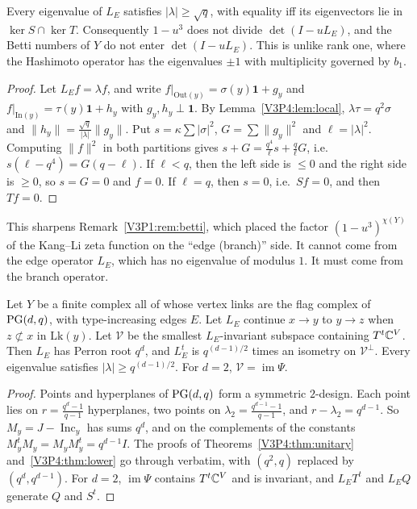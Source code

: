 \begin{theorem}\label{V3P4:thm:lower}
Every eigenvalue of $L_E$ satisfies $|\lambda|\ge\sqrt q$, with equality iff its eigenvectors
lie in $\ker S\cap\ker T$. Consequently $1-u^{3}$ does not divide $\det(I-uL_E)$, and the Betti
numbers of $Y$ do not enter $\det(I-uL_E)$. This is unlike rank one, where the Hashimoto
operator has the eigenvalues $\pm1$ with multiplicity governed by $b_1$.
\end{theorem}

\begin{proof}
Let $L_Ef=\lambda f$, and write $f|_{\mathrm{Out}(y)}=\sigma(y)\mathbf 1+g_y$ and
$f|_{\mathrm{In}(y)}=\tau(y)\mathbf 1+h_y$ with $g_y,h_y\perp\mathbf 1$. By
Lemma~\ref{V3P4:lem:local}, $\lambda\tau=q^{2}\sigma$ and $\|h_y\|=\frac{\sqrt q}{|\lambda|}\|g_y\|$. Put
$s=\kappa\sum|\sigma|^{2}$, $G=\sum\|g_y\|^{2}$ and $\ell=|\lambda|^{2}$. Computing $\|f\|^{2}$ in
both partitions gives $s+G=\frac{q^{4}}{\ell}s+\frac q\ell G$, i.e.\
$s(\ell-q^{4})=G(q-\ell)$. If $\ell<q$, then the left side is $\le0$ and the right side is
$\ge0$, so $s=G=0$ and $f=0$. If $\ell=q$, then $s=0$, i.e.\ $Sf=0$, and then $Tf=0$.
\end{proof}

\begin{remark}\label{V3P4:rem:betti}
This sharpens Remark~\ref{V3P1:rem:betti}, which placed the factor $(1-u^{3})^{\chi(Y)}$ of the
Kang--Li zeta function on the ``edge (branch)'' side. It cannot come from the edge operator
$L_E$, which has no eigenvalue of modulus $1$. It must come from the branch operator.
\end{remark}

\begin{theorem}\label{V3P4:thm:Ad}
Let $Y$ be a finite complex all of whose vertex links are the flag complex of $\mathrm{PG}(d,q)$, with
type-increasing edges $E$. Let $L_E$ continue $x\to y$ to $y\to z$ when $z\not\subset x$ in
$\mathrm{Lk}(y)$. Let $\mathcal V$ be the smallest $L_E$-invariant subspace containing
$T^{t}\mathbb{C}^{V}$. Then $L_E$ has Perron root $q^{d}$, and $L_E^{t}$ is $q^{(d-1)/2}$ times an
isometry on $\mathcal V^{\perp}$. Every eigenvalue satisfies $|\lambda|\ge q^{(d-1)/2}$. For
$d=2$, $\mathcal V=\operatorname{im}\Psi$.
\end{theorem}

\begin{proof}
Points and hyperplanes of $\mathrm{PG}(d,q)$ form a symmetric $2$-design. Each point lies on
$r=\frac{q^{d}-1}{q-1}$ hyperplanes, two points on $\lambda_2=\frac{q^{d-1}-1}{q-1}$, and
$r-\lambda_2=q^{d-1}$. So $M_y=J-\operatorname{Inc}_y$ has sums $q^{d}$, and on the complements
of the constants $M_y^{t}M_y=M_yM_y^{t}=q^{d-1}I$. The proofs of
Theorems~\ref{V3P4:thm:unitary} and~\ref{V3P4:thm:lower} go through verbatim, with
$(q^{2},q)$ replaced by $(q^{d},q^{d-1})$. For $d=2$, $\operatorname{im}\Psi$ contains
$T^{t}\mathbb{C}^{V}$ and is invariant, and $L_ET^{t}$ and $L_EQ$ generate $Q$ and $S^{t}$.
\end{proof}

